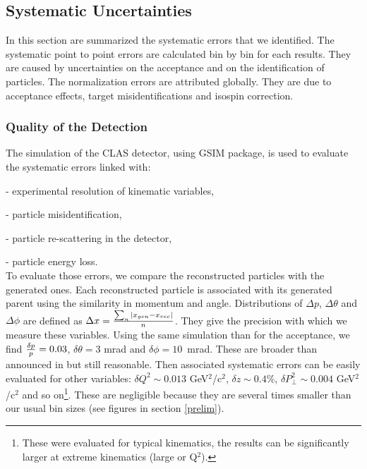 \subsection{Systematic Uncertainties}
\label{sec:TotSys}

In this section are summarized the systematic errors that we identified. The 
systematic point to point errors are calculated bin by bin for each results.
They are caused by uncertainties on the acceptance and on the identification of 
particles. The normalization errors are attributed globally. They are due to 
acceptance effects, target misidentifications and isospin correction.

\subsubsection{Quality of the Detection}
\label{SysId}

The simulation of the CLAS detector, using GSIM package, is used 
to evaluate the systematic errors linked with:

  - experimental resolution of kinematic variables,

  - particle misidentification,

  - particle re-scattering in the detector,

  - particle energy loss.\\


To evaluate those errors, we compare the reconstructed particles with the 
generated ones. Each reconstructed particle is associated with its generated parent using the
similarity in momentum and angle.
Distributions of $\Delta p$, $\Delta \theta$ and $\Delta \phi$ are defined as 
$\Delta x = {\sum_n |x_{gen} - x_{rec}| \over n}$. They give the precision with which we measure 
these variables. Using the same simulation than for the acceptance, we find 
${\delta p \over p } = 0.03$, $\delta \theta = 3$ mrad and 
$\delta \phi = 10$~mrad. These are broader than announced in \cite{Mecking:2003zu} 
but still reasonable. Then associated systematic errors can be easily 
evaluated for other variables: $\delta Q^2 \sim 0.013$ GeV$^2$/c$^2$, $\delta z \sim 
0.4 \%$, $\delta P_\perp^2 \sim 0.004$ GeV$^2$/c$^2$ and so on\footnote{These were 
evaluated for typical kinematics, the results can be significantly larger at 
extreme kinematics (large \pt or Q$^2$).}. These are negligible because they are 
several times smaller than our usual bin sizes (see figures in section 
\ref{prelim}). 

